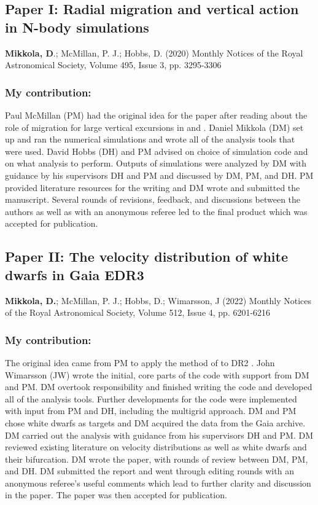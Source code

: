 \subsection*{Paper I: Radial migration and vertical action in N-body simulations}
\textbf{Mikkola, D}.; McMillan, P. J.; Hobbs, D. (2020) \newline
Monthly Notices of the Royal Astronomical Society, Volume 495, Issue 3, pp. 3295-3306 \newline

\subsubsection*{My contribution:}
Paul McMillan (PM) had the original idea for the paper after reading about the role of migration for large vertical excursions in \cite{solway:12} and \cite{vera-ciro:14, vera-ciro:16b}. Daniel Mikkola (DM) set up and ran the numerical simulations and wrote all of the analysis tools that were used. David Hobbs (DH) and PM advised on choice of simulation code and on what analysis to perform. Outputs of simulations were analyzed by DM with guidance by his supervisors DH and PM and discussed by DM, PM, and DH. PM provided literature resources for the writing and DM wrote and submitted the manuscript. Several rounds of revisions, feedback, and discussions between the authors as well as with an anonymous referee led to the final product which was accepted for publication.\newpage


\subsection*{Paper II: The velocity distribution of white dwarfs in Gaia EDR3}
\textbf{Mikkola, D.}; McMillan, P. J.; Hobbs, D.; Wimarsson, J (2022) \newline
Monthly Notices of the Royal Astronomical Society, Volume 512, Issue 4, pp. 6201-6216 \newline

\subsubsection*{My contribution:}
The original idea came from PM to apply the method of \cite{dehnen:98a} to DR2 \citep{dr2}. John Wimarsson (JW) wrote the initial, core parts of the code with support from DM and PM. DM overtook responsibility and finished writing the code and developed all of the analysis tools. Further developments for the code were implemented with input from PM and DH, including the multigrid approach. DM and PM chose white dwarfs as targets and DM acquired the data from the Gaia archive. DM carried out the analysis with guidance from his supervisors DH and PM. DM reviewed existing literature on velocity distributions as well as white dwarfs and their bifurcation. DM wrote the paper, with rounds of review between DM, PM, and DH. DM submitted the report and went through editing rounds with an anonymous referee's useful comments which lead to further clarity and discussion in the paper. The paper was then accepted for publication.


